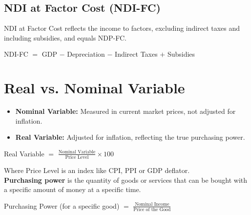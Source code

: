 \documentclass[a4paper, 11pt]{article}
\begin{document}
\subsection{NDI at Factor Cost (NDI-FC)}
NDI at Factor Cost reflects the income to factors, excluding indirect taxes and including subsidies, and equals NDP-FC.
\begin{center}
    NDI-FC $=$ GDP $-$ Depreciation $-$ Indirect Taxes $+$ Subsidies
\end{center}

\section{Real vs. Nominal Variable}
\begin{itemize}
    \item \textbf{Nominal Variable:} Measured in current market prices, not adjusted for inflation.
    \item \textbf{Real Variable:} Adjusted for inflation, reflecting the true purchasing power.
\end{itemize}
\begin{center}
    Real Variable $=$ $\frac{\text{Nominal Variable}}{\text{Price Level}} \times100$
\end{center}
Where Price Level is an index like CPI, PPI or GDP deflator.\\[10pt]
\textbf{Purchasing power} is the quantity of goods or services that can be bought with a specific amount of money at a specific time.
\begin{center}
    Purchasing Power (for a specific good) $=$ $\frac{\text{Nominal Income}}{\text{Price of the Good}}$
\end{center}
\end{document}
